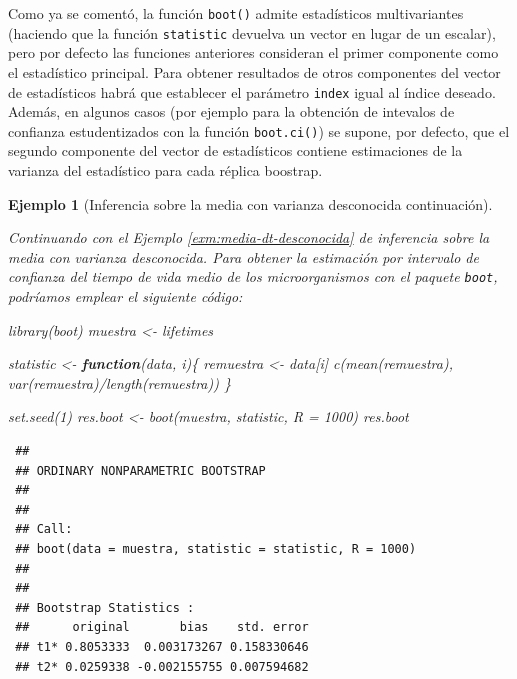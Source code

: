 \documentclass[
]{book}
\newenvironment{Shaded}{\begin{snugshade}}{\end{snugshade}}
\newcommand{\AttributeTok}[1]{\textcolor[rgb]{0.77,0.63,0.00}{#1}}
\newcommand{\ControlFlowTok}[1]{\textcolor[rgb]{0.13,0.29,0.53}{\textbf{#1}}}
\newcommand{\DecValTok}[1]{\textcolor[rgb]{0.00,0.00,0.81}{#1}}
\newcommand{\FunctionTok}[1]{\textcolor[rgb]{0.00,0.00,0.00}{#1}}
\newcommand{\NormalTok}[1]{#1}
\newcommand{\OtherTok}[1]{\textcolor[rgb]{0.56,0.35,0.01}{#1}}
\newcommand{\SpecialCharTok}[1]{\textcolor[rgb]{0.00,0.00,0.00}{#1}}
\theoremstyle{break}
\newtheorem{example}{Ejemplo}[chapter]
\theoremstyle{nonumberplain}
\begin{document}
Como ya se comentó, la función \texttt{boot()} admite estadísticos multivariantes
(haciendo que la función \texttt{statistic} devuelva un vector en lugar de un escalar),
pero por defecto las funciones anteriores consideran el primer componente
como el estadístico principal.
Para obtener resultados de otros componentes del vector de estadísticos
habrá que establecer el parámetro \texttt{index} igual al índice deseado.
Además, en algunos casos (por ejemplo para la obtención de intevalos de confianza
estudentizados con la función \texttt{boot.ci()}) se supone, por defecto, que el segundo
componente del vector de estadísticos contiene estimaciones de la varianza del
estadístico para cada réplica boostrap.

\begin{example}[Inferencia sobre la media con varianza desconocida continuación]
\protect\hypertarget{exm:media-dt-desconocida-boot}{}\label{exm:media-dt-desconocida-boot}

Continuando con el Ejemplo \ref{exm:media-dt-desconocida} de
inferencia sobre la media con varianza desconocida.
Para obtener la estimación por intervalo de confianza del tiempo de vida medio
de los microorganismos con el paquete \texttt{boot}, podríamos emplear
el siguiente código:

\begin{Shaded}
\begin{Highlighting}[]
\FunctionTok{library}\NormalTok{(boot)}
\NormalTok{muestra }\OtherTok{\textless{}{-}}\NormalTok{ lifetimes}

\NormalTok{statistic }\OtherTok{\textless{}{-}} \ControlFlowTok{function}\NormalTok{(data, i)\{}
\NormalTok{  remuestra }\OtherTok{\textless{}{-}}\NormalTok{ data[i]}
  \FunctionTok{c}\NormalTok{(}\FunctionTok{mean}\NormalTok{(remuestra), }\FunctionTok{var}\NormalTok{(remuestra)}\SpecialCharTok{/}\FunctionTok{length}\NormalTok{(remuestra))}
\NormalTok{\}}

\FunctionTok{set.seed}\NormalTok{(}\DecValTok{1}\NormalTok{)}
\NormalTok{res.boot }\OtherTok{\textless{}{-}} \FunctionTok{boot}\NormalTok{(muestra, statistic, }\AttributeTok{R =} \DecValTok{1000}\NormalTok{)}
\NormalTok{res.boot}
\end{Highlighting}
\end{Shaded}

\begin{verbatim}
 ## 
 ## ORDINARY NONPARAMETRIC BOOTSTRAP
 ## 
 ## 
 ## Call:
 ## boot(data = muestra, statistic = statistic, R = 1000)
 ## 
 ## 
 ## Bootstrap Statistics :
 ##      original       bias    std. error
 ## t1* 0.8053333  0.003173267 0.158330646
 ## t2* 0.0259338 -0.002155755 0.007594682
\end{verbatim}


\end{example}
\end{document}
